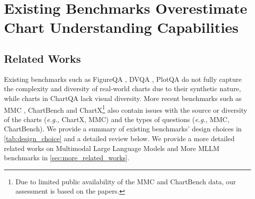 \section{Existing Benchmarks Overestimate Chart Understanding Capabilities}
\label{sec:motivation}

\subsection{Related Works}
\label{subsec:design_flaw}

Existing benchmarks such as FigureQA \cite{kahou2017figureqa}, DVQA \cite{kafle2018dvqa}, PlotQA \cite{methani2020plotqa} do not fully capture the complexity and diversity of real-world charts due to their synthetic nature, while charts in ChartQA \cite{masry2022chartqa} lack visual diversity.
More recent benchmarks such as MMC \cite{liu2024mmc}, ChartBench \cite{xu2024chartbench} and ChartX\footnote{Due to limited public availability of the MMC and ChartBench data, our assessment is based on the papers.} \cite{xia2024chartx} also contain issues with the source or diversity of the charts (\textit{e.g.,} ChartX, MMC) and the types of questions (\textit{e.g.,} MMC, ChartBench).
We provide a summary of existing benchmarks' design choices in \cref{tab:design_choice} and a detailed review below. We provide a more detailed related works on Multimodal Large Language Models and More MLLM benchmarks in \cref{sec:more_related_works}.

